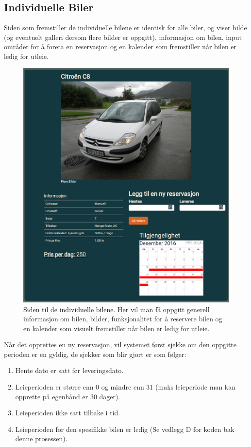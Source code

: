 \subsection{Individuelle Biler}
Siden som fremstiller de individuelle bilene er identisk for alle biler, og viser bilde (og eventuelt galleri dersom flere bilder er oppgitt), informasjon om bilen, input områder for å foreta en reservasjon og en kalender som fremstiller når bilen er ledig for utleie.

 \begin{figure}[htbp]
	\centering
		\includegraphics[scale=0.3]{Bilder/rv_individualcar.png}
	\caption[Individuelle Biler]{ Siden til de individuelle bilene. Her vil man få oppgitt generell informasjon om bilen, bilder, funksjonalitet for å reservere bilen og en kalender som visuelt fremstiller når bilen er ledig for utleie.} %
	\label{fig:rv_individualcar}
\end{figure}

Når det opprettes en ny reservasjon, vil systemet først sjekke om den oppgitte perioden er en gyldig, de sjekker som blir gjort er som følger:
\begin{enumerate}
\item Hente dato er satt før leveringsdato.
\item Leieperioden er større enn 0 og mindre enn 31 (maks leieperiode man kan opprette på egenhånd er 30 dager).
\item Leieperioden ikke satt tilbake i tid.
\item Leieperioden for den spesifikke bilen er ledig (Se vedlegg D for koden bak denne prosessen).
\end{enumerate}

